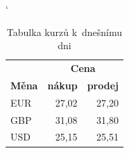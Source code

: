 \documentclass[a4paper, 11pt]{article}
\begin{document}
\begin{table}[h] 
\begin{center}
\catcode` 
\begin{tabular}{|l|r|r|} 
\hline
& \multicolumn{2}{|c|}{\textbf{Cena}}\\ \cline{2-3}
\textbf{Měna} & \textbf{nákup} & \textbf{prodej}\\ \hline
EUR & 27,02 & 27,20\\
GBP & 31,08 & 31,80\\
USD & 25,15 & 25,51\\
\hline
\end{tabular}
\caption{Tabulka kurzů k~dnešnímu dni}
\label{course}
\end{center}
\end{table}
\end{document}
